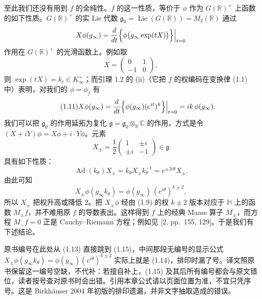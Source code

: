 至此我们还没有用到 $f$ 的全纯性。$f$ 的这一性质，等价于 $\phi$ 作为 $G(\mathbb{R})^+$ 上函数的如下性质。$G(\mathbb{R})^+$ 的实 Lie 代数 $\mathfrak{g}_0=\operatorname{Lie}(G(\mathbb{R}))=M_2(\mathbb{R})$ 通过
\[
X\phi(g_\infty)=\frac{d}{dt}\Bigl\{\phi\bigl(g_\infty\exp(tX)\bigr)\Bigr\}\Big|_{t=0}
\]
作用在 $G(\mathbb{R})^+$ 的光滑函数上。例如取
\[
X=\begin{pmatrix}0&1\\-1&0\end{pmatrix},
\]
则 $\exp(tX)=k_t\in K_\infty^+$；而引理 1.2 的 (ii)（它把 $f$ 的权编码在变换律 (1.1) 中）表明，对我们的 $\phi=\phi_f$ 有
\begin{equation*}\tag{1.11}
X\phi(g_\infty)=\frac{d}{dt}\Bigl\{\phi(g_\infty)(e^{it})^k\Bigr\}\Big|_{t=0}=ik\,\phi(g_\infty).
\end{equation*}
我们可以把 $\mathfrak{g}_0$ 的作用延拓为复化 $\mathfrak{g}=\mathfrak{g}_0\otimes_{\mathbb{R}}\mathbb{C}$ 的作用，方式是令 $(X+iY)\phi=X\phi+i\cdot Y\phi$。元素
\begin{equation*}\tag{1.12}
X_\pm=\frac12\begin{pmatrix}1&\pm i\\ \pm i&-1\end{pmatrix}\in\mathfrak{g}
\end{equation*}
具有如下性质：
\begin{equation*}\tag{1.13}
\operatorname{Ad}(k_\theta)X_\pm=k_\theta X_\pm k_\theta^{-1}=e^{\pm 2i\theta}X_\pm.
\end{equation*}
由此可知
\[
X_\pm\phi(g_\infty k_\theta)=\phi(g_\infty)\,(e^{i\theta})^{k\pm 2},
\]
所以 $X_\pm$ 把权升高或降低 $2$。把 $X_\pm\phi$ 经由 (1.9) 的权 $k\pm 2$ 版本对应于 $\mathbb{H}$ 上的函数 $M_\pm f$，并不难用原 $f$ 的导数表出。这样得到 $f$ 上的经典 Maass 算子 $M_\pm$，而方程 $M_-f=0$ 正是 Cauchy–Riemann 方程；例如见 [2, pp.\ 155, 129]。于是我们有下述结论。

\begin{annote}
原书编号在此处从 (1.13) 直接跳到 (1.15)，中间那段无编号的显示公式 $X_\pm\phi(g_\infty k_\theta)=\phi(g_\infty)(e^{i\theta})^{k\pm2}$ 实际上就是 (1.14)，排印时漏了号。译文照原书保留这一编号空缺，不代补：若擅自补上，(1.15) 及其后所有编号都会与原文错位，读者按号查对原书时会出错。引用本章公式请以页面位置为准，不宜只凭序号。这是 Birkhäuser 2004 年初版的排印遗漏，并非文字抽取造成的错误。

\par\vspace{0.15em}{\raggedleft 【来源：原书第 137 页（A）】\par}
\end{annote}

